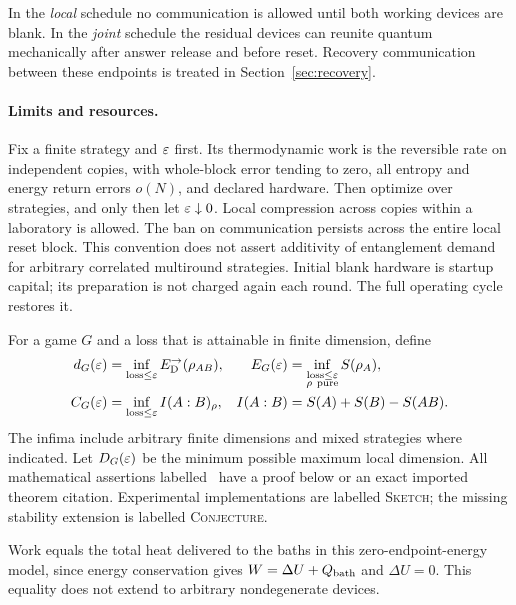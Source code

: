 In the \emph{local} schedule no communication is allowed until both working devices are blank. In the \emph{joint} schedule the residual devices can reunite quantum mechanically after answer release and before reset. Recovery communication between these endpoints is treated in Section~\ref{sec:recovery}.

\paragraph{Limits and resources.}
Fix a finite strategy and $\varepsilon$ first. Its thermodynamic work is the reversible rate on independent copies, with whole-block error tending to zero, all entropy and energy return errors $o(N)$, and declared hardware. Then optimize over strategies, and only then let $\varepsilon\downarrow0$. Local compression across copies within a laboratory is allowed. The ban on communication persists across the entire local reset block. This convention does not assert additivity of entanglement demand for arbitrary correlated multiround strategies. Initial blank hardware is startup capital; its preparation is not charged again each round. The full operating cycle restores it.

For a game $G$ and a loss that is attainable in finite dimension, define
\begin{align}
 d_G(\eps)&=\inf_{\mathrm{loss}\le\eps}\ED(\rho_{AB}),&
 E_G(\eps)&=\inf_{\substack{\mathrm{loss}\le\eps\\\rho\ \mathrm{pure}}}S(\rho_A),\label{eq:demands}\\
 C_G(\eps)&=\inf_{\mathrm{loss}\le\eps}I(A:B)_\rho,&
 I(A:B)&=S(A)+S(B)-S(AB).
\end{align}
The infima include arbitrary finite dimensions and mixed strategies where indicated. Let $D_G(\varepsilon)$ be the minimum possible maximum local dimension. All mathematical assertions labelled \proved\ have a proof below or an exact imported theorem citation. Experimental implementations are labelled \textsc{Sketch}; the missing stability extension is labelled \textsc{Conjecture}.

Work equals the total heat delivered to the baths in this zero-endpoint-energy model, since energy conservation gives $W=\Delta U+Q_{\rm bath}$ and $\Delta U=0$. This equality does not extend to arbitrary nondegenerate devices.
